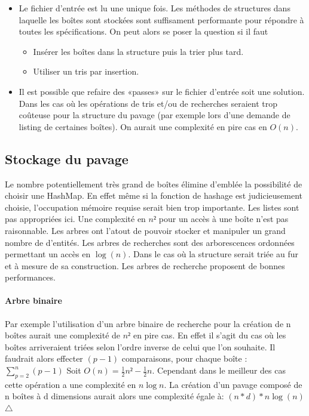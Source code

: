 \begin{itemize}
\item
  Le fichier d'entrée est lu une unique fois. Les méthodes  de structures dans laquelle les boîtes sont stockées sont suffisament performante pour répondre à toutes les spécifications. On peut alors se poser la question si il faut 
  \begin{itemize}
  \item
    Insérer les boîtes dans la structure puis la trier plus tard.
  \item
    Utiliser un tris par insertion.
  \end{itemize}
\item
  Il est possible que refaire des «passes» sur le fichier d'entrée soit une solution. Dans les cas où les opérations de tris et/ou de recherches seraient trop coûteuse pour la structure du pavage (par exemple lors d'une demande de listing de certaines boîtes). On aurait une complexité en pire cas en $O(n)$. 
\end{itemize}
\subsection{Stockage du pavage}
Le nombre potentiellement très grand de boîtes élimine d'emblée la possibilité de choisir une HashMap. En effet même si la fonction de hashage est judicieusement choisie, l'occupation mémoire requise serait bien trop importante. Les listes sont pas appropriées ici. Une complexité en $n²$ pour un accès à une boîte n'est pas raisonnable. Les arbres ont l'atout de pouvoir stocker et manipuler un grand nombre de d'entités. Les arbres de recherches sont des arborescences ordonnées permettant un accès en $\log(n)$. Dans le cas où la structure serait triée au fur et à mesure de sa construction. Les arbres de recherche proposent de bonnes performances.



\paragraph{Arbre binaire}
Par exemple l'utilisation d'un arbre binaire de recherche pour la création de n boîtes aurait une complexité de $n²$ en pire cas. En effet il s'agit du cas où les boîtes arriveraient triées selon l'ordre inverse de celui que l'on souhaite. Il faudrait alors effecter $(p-1)$ comparaisons, pour chaque boîte :  $\sum_{p=2}^{n}(p-1)$  Soit $O(n)=\frac{1}{2}n²-\frac{1}{2}n$. Cependant dans le meilleur des cas cette opération a une complexité en $n\log{n}$.
La création d'un pavage composé de n boîtes à d dimensions aurait alors une complexité égale à: $(n*d)*n\log(n)$ $\triangle$
\clearpage
